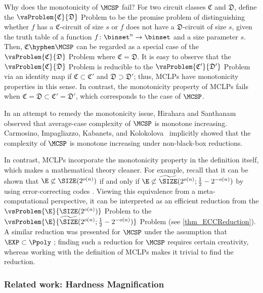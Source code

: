 \documentclass{toc}
\begin{document}
Why does the monotonicity of $\MCSP$ fail?
For two circuit classes $\mathfrak{C}$ and $\mathfrak{D}$,
define the $\vsProblem{\mathfrak{C}}{\mathfrak{D}}$ Problem
to be the promise problem of distinguishing
whether $f$ has a $\mathfrak{C}$-circuit of size $s$
or $f$ does not have a $\mathfrak{D}$-circuit of size $s$,
given the truth table of a function $f \colon \binset^n \to \binset$
and a size parameter $s$.
Then,
$\mathfrak{C}\hyphen\MCSP$ can be regarded as a special case of the $\vsProblem{\mathfrak{C}}{\mathfrak{D}}$ Problem where $\mathfrak{C} = \mathfrak{D}$.
It is easy to observe that
the $\vsProblem{\mathfrak{C}}{\mathfrak{D}}$ Problem is reducible to
the $\vsProblem{\mathfrak{C'}}{\mathfrak{D'}}$ Problem via an identity map
if $\mathfrak{C} \subset \mathfrak{C'}$
and
$\mathfrak{D} \supset \mathfrak{D'}$;
thus, MCLPs have monotonicity properties in this sense.
In contrast,
the monotonicity property of MCLPs fails when
$\mathfrak{C} = \mathfrak{D} \subset \mathfrak{C}' = \mathfrak{D}'$,
which corresponds to the case of $\MCSP$.

In an attempt to remedy the monotonicity issue,
Hirahara and Santhanam~\cite{HiraharaS17_coco_conf}
observed that
average-case complexity of $\MCSP$ is monotone increasing.
%
%
Carmosino, Impagliazzo, Kabanets, and Kolokolova~\cite{CarmosinoIKK16_coco_conf}
implicitly showed
that
the complexity of $\MCSP$ is monotone increasing under non-black-box reductions.

In contrast,
MCLPs incorporate
the monotonicity property
in the definition itself,
which makes a mathematical theory cleaner.
For example,
recall that
it can be shown that
$\E \not\subset \SIZE(2^{o(n)})$
if and only if
$\E \not\subset \widetilde{\SIZE}(2^{o(n)}; \frac{1}{2} - 2^{-o(n)})$
by using error-correcting codes \cite{SudanTV01_jcss_journals}.
Viewing this equivalence from a meta-computational perspective,
it can be interpreted as an efficient reduction
from
the $\vsProblem{\E}{\SIZE(2^{o(n)})}$ Problem
to
the $\vsProblem{\E}{\widetilde{\SIZE}(2^{o(n)}; \frac{1}{2} - 2^{-o(n)})}$ Problem
%
(see \cref{thm_ECCReduction}). %
A similar reduction was presented for $\MCSP$ under the assumption that $\EXP \subset \Ppoly$ \cite{ChenHOPRS20_innovations_conf};
finding such a reduction for $\MCSP$ requires certain creativity,
whereas working with the definition of MCLPs makes it trivial to find the reduction.
%


\subsubsection{Related work: Hardness Magnification}
\end{document}
